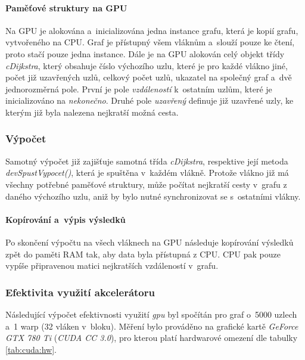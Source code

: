 \paragraph{Paměťové struktury na GPU}
Na GPU je alokována a~inicializována jedna instance grafu, která je kopií grafu, vytvořeného na CPU. Graf je přístupný všem vláknům a~slouží pouze ke čtení, proto stačí pouze jedna instance. Dále je na GPU alokován celý objekt třídy \textit{cDijkstra}, který obsahuje číslo výchozího uzlu, které je pro každé vlákno jiné, počet již uzavřených uzlů, celkový počet uzlů, ukazatel na společný graf a~dvě jednorozměrná pole. První je pole \textit{vzdáleností} k~ostatním uzlům, které je inicializováno na \textit{nekonečno}. Druhé pole \textit{uzavřený} definuje již uzavřené uzly, ke kterým již byla nalezena nejkratší možná cesta.



\subsubsection{Výpočet}
Samotný výpočet již zajišťuje samotná třída \textit{cDijkstra}, respektive její metoda \textit{devSpustVypocet()}, která je spuštěna v~každém vlákně. Protože vlákno již má všechny potřebné paměťové struktury, může počítat nejkratší cesty v~grafu z daného výchozího uzlu, aniž by bylo nutné synchronizovat se s~ostatními vlákny.

\paragraph{Kopírování a~výpis výsledků}
Po skončení výpočtu na všech vláknech na GPU následuje kopírování výsledků zpět do paměti RAM tak, aby data byla přístupná z CPU. CPU pak pouze vypíše připravenou matici nejkratších vzdáleností v~grafu.


\subsubsection{Efektivita využití akcelerátoru} \label{l:cuda:dijkstra:efektivita}
Následující výpočet efektivnosti využití \emph{gpu} byl spočítán pro graf o~5000 uzlech a~1 warp (32 vláken v~bloku).
Měření bylo prováděno na grafické kartě \emph{GeForce GTX 780 Ti} (\emph{CUDA CC 3.0}), pro kterou platí hardwarové omezení 
dle tabulky \ref{tab:cuda:hw}.

